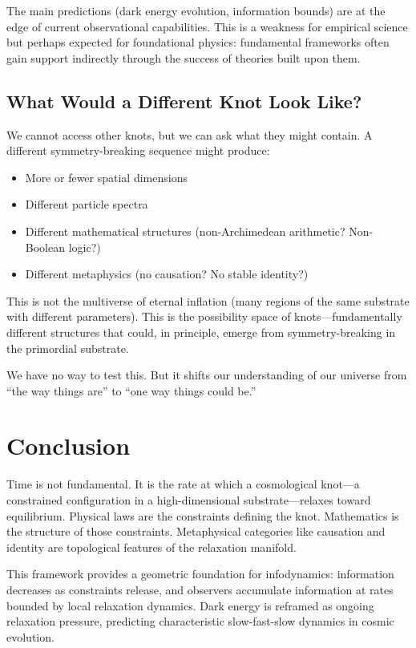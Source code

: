 \documentclass[11pt,a4paper]{article}
\begin{document}
The main predictions (dark energy evolution, information bounds) are at the edge of current observational capabilities. This is a weakness for empirical science but perhaps expected for foundational physics: fundamental frameworks often gain support indirectly through the success of theories built upon them.

\subsection{What Would a Different Knot Look Like?}

We cannot access other knots, but we can ask what they might contain. A different symmetry-breaking sequence might produce:
\begin{itemize}
    \item More or fewer spatial dimensions
    \item Different particle spectra
    \item Different mathematical structures (non-Archimedean arithmetic? Non-Boolean logic?)
    \item Different metaphysics (no causation? No stable identity?)
\end{itemize}

This is not the multiverse of eternal inflation (many regions of the same substrate with different parameters). This is the possibility space of knots---fundamentally different structures that could, in principle, emerge from symmetry-breaking in the primordial substrate.

We have no way to test this. But it shifts our understanding of our universe from ``the way things are'' to ``one way things could be.''

\section{Conclusion}

Time is not fundamental. It is the rate at which a cosmological knot---a constrained configuration in a high-dimensional substrate---relaxes toward equilibrium. Physical laws are the constraints defining the knot. Mathematics is the structure of those constraints. Metaphysical categories like causation and identity are topological features of the relaxation manifold.

This framework provides a geometric foundation for infodynamics: information decreases as constraints release, and observers accumulate information at rates bounded by local relaxation dynamics. Dark energy is reframed as ongoing relaxation pressure, predicting characteristic slow-fast-slow dynamics in cosmic evolution.
\end{document}
